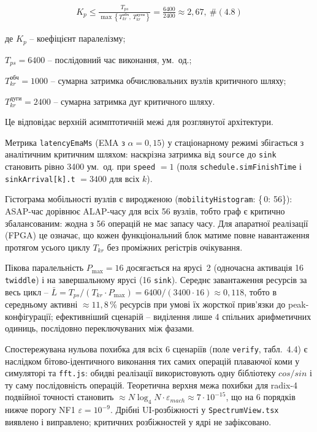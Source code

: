 \documentclass[
]{article}
\newcommand{\passthrough}[1]{#1}
\begin{document}
\[\begin{array}{r}
K_{p} \leq \frac{T_{ps}}{\max\left\{ T_{kr}^{\text{обч}},\, T_{kr}^{\text{дуги}} \right\}} = \frac{6400}{2400} \approx 2,67,\ \#(4.8)
\end{array}\]

де \(K_{p}\) -- коефіцієнт паралелізму;

\(T_{ps} = 6400\) -- послідовний час виконання, ум.~од.;

\(T_{kr}^{\text{обч}} = 1000\) -- сумарна затримка обчислювальних вузлів
критичного шляху;

\(T_{kr}^{\text{дуги}} = 2400\) -- сумарна затримка дуг критичного
шляху.

Це відповідає верхній асимптотичній межі для розглянутої архітектури.

Метрика \passthrough{\lstinline!latencyEmaMs!} (EMA з \(\alpha = 0,15\))
у стаціонарному режимі збігається з аналітичним критичним шляхом:
наскрізна затримка від \passthrough{\lstinline!source!} до
\passthrough{\lstinline!sink!} становить рівно 3400 ум.~од. при
\passthrough{\lstinline!speed!} \(= 1\) (поля
\passthrough{\lstinline!schedule.simFinishTime!} і
\passthrough{\lstinline!sinkArrival!}\passthrough{\lstinline![k].t!}
\(= 3400\) для всіх \(k\)).

Гістограма мобільності вузлів є виродженою
(\passthrough{\lstinline!mobilityHistogram!}: \{ 0: 56\}): ASAP-час
дорівнює ALAP-часу для всіх 56 вузлів, тобто граф є критично
збалансованим: жодна з 56 операцій не має запасу часу. Для апаратної
реалізації (FPGA) це означає, що кожен функціональний блок матиме повне
навантаження протягом усього циклу \(T_{kr}\) без проміжних регістрів
очікування.

Пікова паралельність \(P_{\max} = 16\) досягається на ярусі~2 (одночасна
активація 16 \passthrough{\lstinline!twiddle!}) і на завершальному ярусі
(16 \passthrough{\lstinline!sink!}). Середнє завантаження ресурсів за
весь цикл --
\(\bar{L} = T_{ps}/(T_{kr} \cdot P_{\max}) = 6400/(3400 \cdot 16) \approx 0,118\),
тобто в середньому активні \(\approx 11,8\,\%\) ресурсів при умові їх
жорсткої прив'язки до peak-конфігурації; ефективніший сценарій --
виділення лише 4 спільних арифметичних одиниць, послідовно
переключуваних між фазами.

Спостережувана нульова похибка для всіх 6 сценаріїв (поле
\passthrough{\lstinline!verify!}, табл.~4.4) є наслідком
бітово-ідентичного виконання тих самих операцій плаваючої коми у
симуляторі та \passthrough{\lstinline!fft.js!}: обидві реалізації
використовують одну бібліотеку \(cos/sin\) і ту саму послідовність
операцій. Теоретична верхня межа похибки для radix-4 подвійної точності
становить
\(\approx N\log_{4}N \cdot \varepsilon_{mach} \approx 7 \cdot 10^{- 15}\),
що на 6 порядків нижче порогу NF1 \(\varepsilon = 10^{- 9}\). Дрібні
UI-розбіжності у \passthrough{\lstinline!SpectrumView.tsx!} виявлено і
виправлено; критичних розбіжностей у ядрі не зафіксовано.
\end{document}
